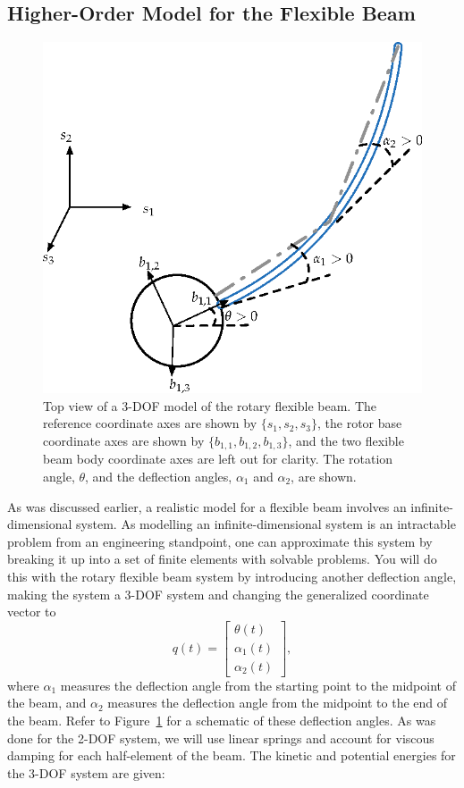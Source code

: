 \documentclass[12pt]{report}
\begin{document}
\subsection{Higher-Order Model for the Flexible Beam}\label{subsection:lab1_higher_order}
\begin{figure}[htb!]
    \centering
    \includegraphics[width=.5\linewidth]{eps/lab_1/rotary_flexible_beam_3DOF_edit}
    \caption{Top view of a 3-DOF model of the rotary flexible beam. The reference coordinate axes are shown by $\{s_1,s_2,s_3\}$, the rotor base coordinate axes are shown by $\{b_{1,1},b_{1,2}, b_{1,3}\}$, and the two flexible beam body coordinate axes are left out for clarity.  The rotation angle, $\theta$, and the deflection angles, $\alpha_1$ and $\alpha_2$, are shown.}
    \label{fig:lab1_rotary_flexible_beam_3DOF}
\end{figure}
As was discussed earlier, a realistic model for a flexible beam involves an infinite-dimensional system. As modelling an infinite-dimensional system is an intractable problem from an engineering standpoint, one can approximate this system by breaking it up into a set of finite elements with solvable problems. You will do this with the rotary flexible beam system by introducing another deflection angle, making the system a 3-DOF system and changing the generalized coordinate vector to
\[
    q(t) = \left[\begin{array}{c}
            \theta(t)   \\
            \alpha_1(t) \\
            \alpha_2(t)
        \end{array}\right],
\]
where $\alpha_1$ measures the deflection angle from the starting point to the midpoint of the beam, and $\alpha_2$ measures the deflection angle from the midpoint to the end of the beam. Refer to Figure~\ref{fig:lab1_rotary_flexible_beam_3DOF} for a schematic of these deflection angles. As was done for the 2-DOF system, we will use linear springs and account for viscous damping for each half-element of the beam. The kinetic and potential energies for the 3-DOF system are given:
\end{document}
